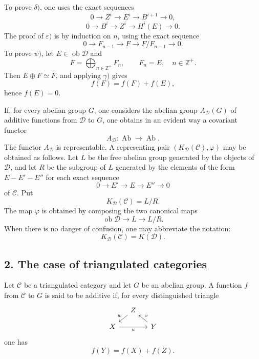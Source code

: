 \documentclass[11pt]{article}
\providecommand{\Ob}{\operatorname{ob}}
\providecommand{\cC}{\mathcal C}
\providecommand{\Ob}{\operatorname{ob}}
\providecommand{\Ab}{\operatorname{Ab}}
\providecommand{\cC}{\mathcal C}
\providecommand{\cD}{\mathcal D}
\providecommand{\Ab}{\operatorname{Ab}}
\providecommand{\Ob}{\operatorname{Ob}}
\providecommand{\Ob}{\operatorname{ob}}
\begin{document}
To prove $\delta)$, one uses the exact sequences
\[
0\longrightarrow Z^i\longrightarrow E^i\longrightarrow B^{i+1}\longrightarrow 0,
\]
\[
0\longrightarrow B^i\longrightarrow Z^i\longrightarrow H^i(E)\longrightarrow 0.
\]
The proof of $\varepsilon)$ is by induction on $n$, using the exact sequence
\[
0\longrightarrow F_{n-1}\longrightarrow F\longrightarrow F/F_{n-1}\longrightarrow 0.
\]
To prove $\psi)$, let $E\in\Ob\cD$ and
\[
F=\bigoplus_{n\in\mathbb Z^+}F_n,\qquad F_n=E,\quad n\in\mathbb Z^+.
\]
Then $E\oplus F\simeq F$, and applying $\gamma)$ gives
\[
f(F)=f(F)+f(E),
\]
hence $f(E)=0$.

If, for every abelian group $G$, one considers the abelian group $A_{\cD}(G)$ of additive functions from $\cD$ to $G$, one obtains in an evident way a covariant functor
\[
A_{\cD}:\Ab\longrightarrow\Ab.
\]
The functor $A_{\cD}$ is representable. A representing pair $(K_{\cD}(\cC),\varphi)$ may be obtained as follows. Let $L$ be the free abelian group generated by the objects of $\cD$, and let $R$ be the subgroup of $L$ generated by the elements of the form $E-E'-E''$ for each exact sequence
\[
0\longrightarrow E'\longrightarrow E\longrightarrow E''\longrightarrow 0
\]
of $\cC$. Put
\[
K_{\cD}(\cC)=L/R.
\]
The map $\varphi$ is obtained by composing the two canonical maps
\[
\Ob\cD\longrightarrow L\longrightarrow L/R.
\]
When there is no danger of confusion, one may abbreviate the notation:
\[
K_{\cD}(\cC)=K(\cD).
\]

\subsection*{2. The case of triangulated categories}

Let $\cC$ be a triangulated category and let $G$ be an abelian group. A function $f$ from $\cC$ to $G$ is said to be additive if, for every distinguished triangle
\[
\begin{tikzcd}[column sep=small,row sep=small]
& Z \arrow[dl,"w"']\\
X \arrow[rr,"u"'] && Y \arrow[ul,"v"']
\end{tikzcd}
\]
one has
\[
f(Y)=f(X)+f(Z).
\]
\end{document}
